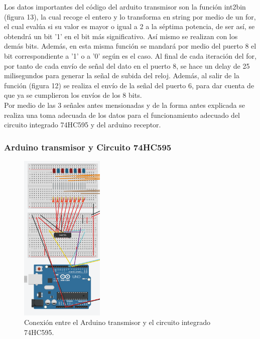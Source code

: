 \documentclass{article}
\begin{document}
Los datos importantes del código del arduito transmisor son la función int2bin (figura 13), la cual recoge el entero y lo transforma en string por medio de un for, el cual evalúa si su valor es mayor o igual a 2 a la séptima potencia, de ser así, se obtendrá un bit '1' en el bit más significativo. Así mismo se realizan con los demás bits. Además, en esta misma función se mandará por medio del puerto 8 el bit correspondiente a '1' o a '0' según es el caso. Al final de cada iteración del for, por tanto de cada envío de señal del dato en el puerto 8, se hace un delay de 25 milisegundos para generar la señal de subida del reloj. Además, al salir de la función (figura 12) se realiza el envío de la señal del puerto 6, para dar cuenta de que ya se cumplieron los envíos de los 8 bits.\\

Por medio de las 3 señales antes mensionadas y de la forma antes explicada se realiza una toma adecuada de los datos para el funcionamiento adecuado del circuito integrado 74HC595 y del arduino receptor.\\

\newpage

\subsubsection{Arduino transmisor y Circuito 74HC595}


\begin{figure}[h]
\includegraphics[width=4cm]{conexion_arduino_con_74HC595.PNG}
\centering
\caption{Conexión entre el Arduino transmisor y el circuito integrado 74HC595.}
\label{fig:conexion_arduino_con_74HC595.PNG}
\end{figure}
\cite{completo}\\
\end{document}
